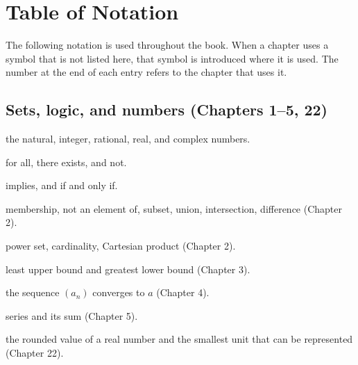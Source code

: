 \appendix
\renewcommand{\appendixname}{Appendix}
\chapter{Table of Notation}
\label{app:notasi}

The following notation is used throughout the book. When a chapter uses a symbol that is
not listed here, that symbol is introduced where it is used. The number at the end of each
entry refers to the chapter that uses it.

\section*{Sets, logic, and numbers (Chapters 1--5, 22)}
\begin{description}[style=nextline,itemsep=0.25em]
  \item[$\mathbb{N}$, $\mathbb{Z}$, $\mathbb{Q}$, $\mathbb{R}$, $\mathbb{C}$]
        the natural, integer, rational, real, and complex numbers.
  \item[$\forall$, $\exists$, $\neg$] for all, there exists, and not.
  \item[$\Rightarrow$, $\Leftrightarrow$] implies, and if and only if.
  \item[$\in$, $\notin$, $\subseteq$, $\cup$, $\cap$, $\setminus$] membership,
        not an element of, subset, union, intersection, difference (Chapter 2).
  \item[$\mathcal{P}(S)$, $|S|$, $S\times T$] power set, cardinality,
        Cartesian product (Chapter 2).
  \item[$\sup S$, $\inf S$] least upper bound and greatest lower bound (Chapter 3).
  \item[$a_n\to a$] the sequence $(a_n)$ converges to $a$ (Chapter 4).
  \item[$\sum_{n=1}^{\infty} a_n$] series and its sum (Chapter 5).
  \item[$\mathrm{fl}(x)$, $\mathrm{ulp}$] the rounded value of a real number and the
        smallest unit that can be represented (Chapter 22).
\end{description}

